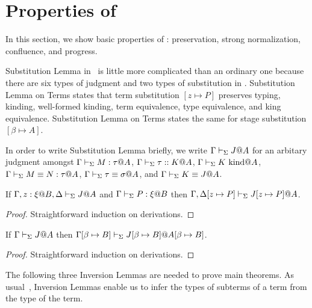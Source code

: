
\section{Properties of \LMD}

In this section, we show basic properties of \LMD: preservation, strong normalization, confluence, and progress.


Substitution Lemma in \LMD\ is little more complicated than an ordinary one 
because there are six types of judgment and two types of substitution in \LMD.
Substitution Lemma on Terms states that term substitution $[z \mapsto P]$ preserves
typing, kinding, well-formed kinding, term equivalence, type equivalence, and king equivalence.
Substitution Lemma on Terms states the same for stage substitution $[\beta\mapsto A]$.

In order to write Substitution Lemma briefly, we write $\Gamma\vdash_\Sigma J@A$ for an arbitary judgment
amongst $\G\V M:\tau@A$, $\Gamma\vdash_\Sigma \tau::K@A$, $\Gamma\vdash_\Sigma K \text{\ kind} @A$, $\Gamma\vdash_\Sigma M \equiv N : \tau @ A$, 
$\Gamma\vdash_\Sigma \tau \equiv \sigma @ A$, and $\Gamma \vdash_\Sigma K \equiv J @ A$.

\begin{lemma}
	If $\G, z:\xi@B, \D \V J @ A$ and $\Gamma\vdash_\Sigma P:\xi @B$ then $\Gamma, \Delta[z \mapsto P] \vdash_\Sigma J[z \mapsto P] @ A$.
\end{lemma}


\begin{proof}
	Straightforward induction on derivations.
\end{proof}

\begin{lemma}
	If $\Gamma \vdash_\Sigma J @ A$ then $\Gamma[\beta\mapsto B] \vdash_\Sigma J[\beta\mapsto B] @ A[\beta\mapsto B]$.
\end{lemma}

\begin{proof}
	Straightforward induction on derivations.
\end{proof}


The following three Inversion Lemmas are needed to prove main theorems.
As usual~\cite{TAPL}, Inversion Lemmas enable us to infer the types of subterms of a term from the type of the term.

